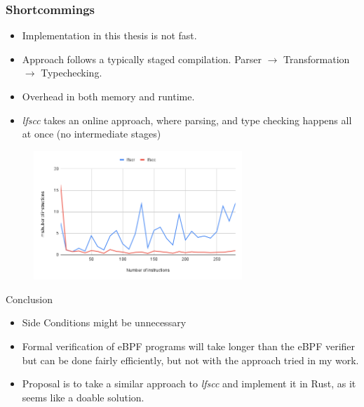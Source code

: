 \documentclass[10pt,t]{beamer}
\begin{document}
\begin{frame}[c]
  \frametitle{Shortcommings}
  \begin{itemize}
    \item Implementation in this thesis is not fast.
    \item Approach follows a typically staged compilation.
          Parser $\rightarrow$ Transformation $\rightarrow$ Typechecking.
    \item Overhead in both memory and runtime.
    \item \textit{lfscc} takes an online approach,
          where parsing, and type checking happens all at once (no intermediate stages)
  \end{itemize}
  \begin{figure}
    \includegraphics[width=0.7\textwidth]{chart2.png}
  \end{figure}
\end{frame}

\begin{frame}{Conclusion}
  \begin{itemize}
    \item Side Conditions might be unnecessary
    \item Formal verification of eBPF programs will take longer than the eBPF verifier
          but can be done fairly efficiently, but not with the approach tried in my work.
    \item Proposal is to take a similar approach to \textit{lfscc} and implement it in Rust, as it seems like a doable
          solution.
  \end{itemize}
\end{frame}
\end{document}
